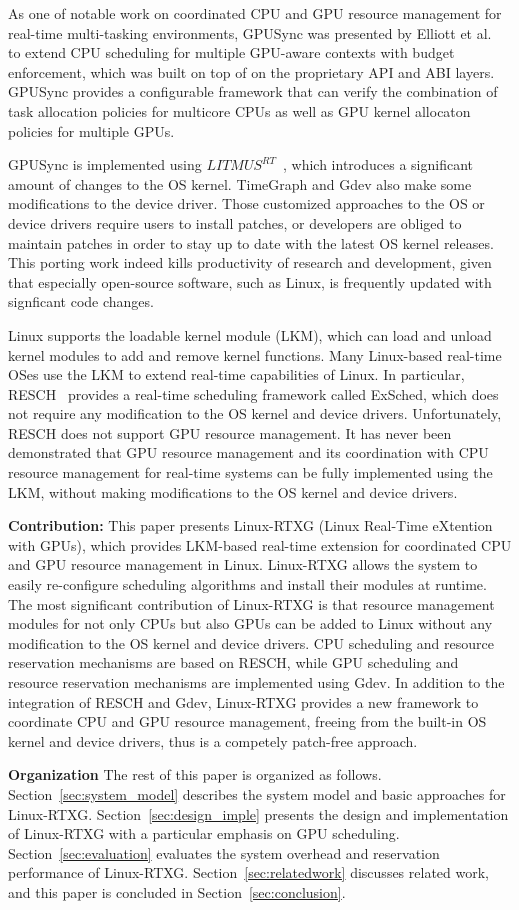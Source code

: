 As one of notable work on coordinated CPU and GPU resource management
for real-time multi-tasking environments, GPUSync was presented by
Elliott et al.~\cite{elliott:gpusync13,elliott:explor14} to extend CPU
scheduling for multiple GPU-aware contexts with budget enforcement,
which was built on top of on the proprietary API and ABI layers.
GPUSync provides a configurable framework that can verify the
combination of task allocation policies for multicore CPUs as well as
GPU kernel allocaton policies for multiple GPUs.

GPUSync is implemented using $LITMUS^{RT}$~\cite{litmus}, which
introduces a significant amount of changes to the OS kernel.
TimeGraph and Gdev also make some modifications to the device driver.
Those customized approaches to the OS or device drivers require users to
install patches, or developers are obliged to maintain patches in order
to stay up to date with the latest OS kernel releases.
This porting work indeed kills productivity of research and development,
given that especially open-source software, such as Linux, is frequently
updated with signficant code changes.

Linux supports the loadable kernel module (LKM), which can load and
unload kernel modules to add and remove kernel functions.
Many Linux-based real-time OSes use the LKM to extend real-time
capabilities of Linux.
In particular, RESCH~\cite{kato2009loadable, asberg2012exsched} provides
a real-time scheduling framework called ExSched, which does not require
any modification to the OS kernel and device drivers.
Unfortunately, RESCH does not support GPU resource management.
It has never been demonstrated that GPU resource management and its
coordination with CPU resource management for real-time systems can be
fully implemented using the LKM, without making modifications to the OS
kernel and device drivers.

\textbf{Contribution:}
This paper presents Linux-RTXG (Linux Real-Time eXtention with GPUs),
which provides LKM-based real-time extension for coordinated CPU and GPU
resource management in Linux.
Linux-RTXG allows the system to easily re-configure scheduling
algorithms and install their modules at runtime.
The most significant contribution of Linux-RTXG is that resource
management modules for not only CPUs but also GPUs can be added to Linux
without any modification to the OS kernel and device drivers.
CPU scheduling and resource reservation mechanisms are based on RESCH,
while GPU scheduling and resource reservation mechanisms are implemented
using Gdev.
In addition to the integration of RESCH and Gdev, Linux-RTXG provides a
new framework to coordinate CPU and GPU resource management, freeing
from the built-in OS kernel and device drivers, thus is a competely
patch-free approach.

\textbf{Organization}
The rest of this paper is organized as follows.
Section~\ref{sec:system_model} describes the system model and basic
approaches for Linux-RTXG.
Section~\ref{sec:design_imple} presents the design and implementation of
Linux-RTXG with a particular emphasis on GPU scheduling.
Section~\ref{sec:evaluation} evaluates the system overhead and
reservation performance of Linux-RTXG.
Section~\ref{sec:relatedwork} discusses related work, and this paper is
concluded in Section~\ref{sec:conclusion}.
